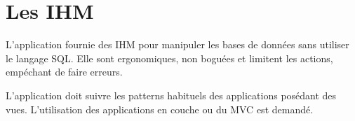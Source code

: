 \section{Les IHM}
L'application fournie des IHM pour manipuler les bases de données sans utiliser le langage SQL.
Elle sont ergonomiques, non boguées et limitent les actions, empéchant de faire  erreurs.

L'application doit suivre les patterns habituels des applications posédant des vues.
L'utilisation des applications en couche ou du MVC est demandé.
